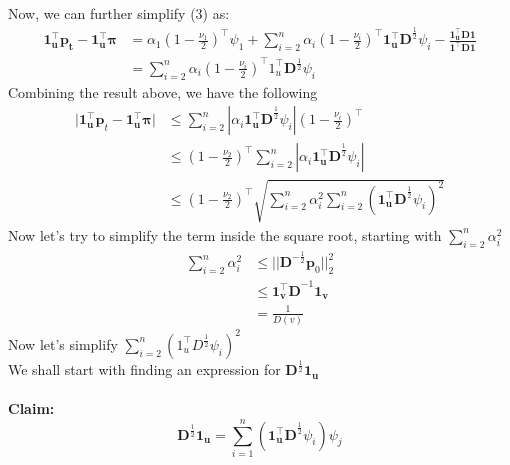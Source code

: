 \documentclass[11pt]{article}
\begin{document}
Now, we can further simplify (3) as:
\begin{equation*}
    \begin{split}
         \mathbf{1^\top _up_t - 1_u^\top \pi}
         &= \alpha_1(1-\frac{\nu_1}{2})^\top \psi_1 +\sum_{i=2}^{n}\alpha_i(1-\frac{\nu_i}{2})^\top \mathbf{1_u^\top D}^{\frac{1}{2}}\psi_i -\mathbf{\frac{1^\top _uD1}{1^\top D1}}\\
         &= \sum_{i=2}^{n}\alpha_i(1-\frac{\nu_i}{2})^\top 1_u^\top \mathbf{D}^{\frac{1}{2}}\psi_i
    \end{split}
\end{equation*}
Combining the result above, we have the following
\begin{equation}
    \begin{split}
        \mathbf{|1_u^\top p}_t - \mathbf{1_u^\top \pi|} 
        &\leq \sum_{i=2}^{n}|\alpha_i\mathbf{1_u^\top D}^{\frac{1}{2}}\psi_i|(1-\frac{\nu_i}{2})^\top\\
        &\leq (1-\frac{\nu_2}{2})^\top \sum_{i=2}^{n}|\alpha_i\mathbf{1_u^\top D}^{\frac{1}{2}}\psi_i|\\
        &\leq (1-\frac{\nu_2}{2})^\top \sqrt{\sum_{i=2}^{n}\alpha_i^2\sum_{i=2}^{n}(\mathbf{1_u^\top D}^{\frac{1}{2}}\psi_i)^2}
    \end{split}
\end{equation}
Now let's try to simplify the term inside the square root, starting with $\sum_{i=2}^{n}\alpha_i^2$
\begin{equation}
    \begin{split}
         \sum_{i=2}^{n}\alpha_i^2 
         & \mathbf{\leq ||D}^{-\frac{1}{2}}\mathbf{p}_0||_2^2 \\
         &\mathbf{\leq 1_v^\top D}^{-1}\mathbf{1_v}\\ 
         &= \frac{1}{D(v)}
    \end{split}
\end{equation}
Now let's simplify $\sum_{i=2}^{n}(1_u^\top D^{\frac{1}{2}}\psi_i)^2$\\
We shall start with finding an expression for $\mathbf{D}^{\frac{1}{2}}\mathbf{1_u}$\\\\
\textbf{Claim:} 
\begin{equation*}
    \mathbf{D}^{\frac{1}{2}}\mathbf{1_u} = \sum_{i=1}^{n}(\mathbf{1_u^\top D}^{\frac{1}{2}}\psi_i)\psi_j
\end{equation*}
\end{document}
